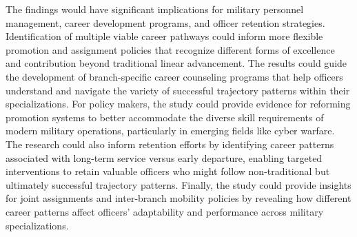 \documentclass[../main.tex]{subfiles}
\begin{document}
The findings would have significant implications for military personnel management, career development programs, and officer retention strategies. Identification of multiple viable career pathways could inform more flexible promotion and assignment policies that recognize different forms of excellence and contribution beyond traditional linear advancement. The results could guide the development of branch-specific career counseling programs that help officers understand and navigate the variety of successful trajectory patterns within their specializations. For policy makers, the study could provide evidence for reforming promotion systems to better accommodate the diverse skill requirements of modern military operations, particularly in emerging fields like cyber warfare. The research could also inform retention efforts by identifying career patterns associated with long-term service versus early departure, enabling targeted interventions to retain valuable officers who might follow non-traditional but ultimately successful trajectory patterns. Finally, the study could provide insights for joint assignments and inter-branch mobility policies by revealing how different career patterns affect officers' adaptability and performance across military specializations.

\end{document}

